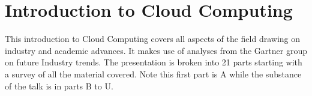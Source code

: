 \FILENAME

\section{Introduction to Cloud Computing}
\label{s:icloud-fundamentals}

This introduction to Cloud Computing covers all aspects of the field drawing on industry and academic advances. It makes use of analyses from the Gartner group on future Industry trends. The presentation is broken into 21 parts starting with a survey of all the material covered. Note this first part is A while the substance of the talk is in parts B to U. 


%


